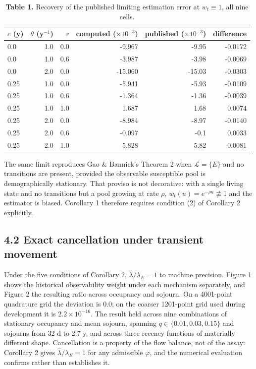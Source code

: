 \begin{table}[htbp]
  \centering
  \small
  \caption*{\textbf{Table 1.} Recovery of the published limiting estimation error at $w_t\equiv1$, all nine cells.}
  \label{tab:table_1}
  \begin{tabular}{lrrrrr}
    \toprule
    $c$ (y) & $\theta$ (y$^{-1}$) & $r$ & computed ($\times10^{-3}$) & published ($\times10^{-3}$) & difference \\
    \midrule
    0.0 & 1.0 & 0.0 & -9.967 & -9.95 & -0.0172 \\
    0.0 & 1.0 & 0.6 & -3.987 & -3.98 & -0.0069 \\
    0.0 & 2.0 & 0.0 & -15.060 & -15.03 & -0.0303 \\
    0.25 & 1.0 & 0.0 & -5.941 & -5.93 & -0.0109 \\
    0.25 & 1.0 & 0.6 & -1.364 & -1.36 & -0.0039 \\
    0.25 & 1.0 & 1.0 & 1.687 & 1.68 & 0.0074 \\
    0.25 & 2.0 & 0.0 & -8.984 & -8.97 & -0.0140 \\
    0.25 & 2.0 & 0.6 & -0.097 & -0.1 & 0.0033 \\
    0.25 & 2.0 & 1.0 & 5.828 & 5.82 & 0.0081 \\
    \bottomrule
  \end{tabular}
\end{table}

The same limit reproduces Gao \& Bannick's Theorem 2 when \(\mathcal{L}=\{E\}\) and no transitions are present, provided the observable susceptible pool is demographically stationary. That proviso is not decorative: with a single living state and no transitions but a pool growing at rate \(\rho\), \(w_t(u)=e^{-\rho u}\not\equiv1\) and the estimator is biased. Corollary 1 therefore requires condition (2) of Corollary 2 explicitly.

\subsection{4.2 Exact cancellation under transient movement}

Under the five conditions of Corollary 2, \(\hat\lambda/\lambda_E=1\) to machine precision. Figure 1 shows the historical observability weight under each mechanism separately, and Figure 2 the resulting ratio across occupancy and sojourn. On a 4001-point quadrature grid the deviation is \(0.0\); on the coarser 1201-point grid used during development it is \(2.2\times10^{-16}\). The result held across nine combinations of stationary occupancy and mean sojourn, spanning \(q\in\{0.01,0.03,0.15\}\) and sojourns from 32 d to 2.7 y, and across three recency functions of materially different shape. Cancellation is a property of the flow balance, not of the assay: Corollary 2 gives \(\hat\lambda/\lambda_E=1\) for any admissible \(\varphi\), and the numerical evaluation confirms rather than establishes it.

